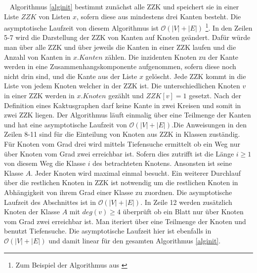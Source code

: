 \vspace{-6mm}
~\linebreak
Algorithmus \ref{alginit} bestimmt zunächst alle ZZK und speichert sie in einer Liste $ZZK$ von Listen $x$, sofern diese aus mindestens drei Kanten besteht. Die asymptotische Laufzeit von diesem Algorithmus ist $\mathcal{O}(|V|+|E|)$ \footnote{Zum Beispiel der Algorithmus aus \cite{vorlesung}}. \newline
In den Zeilen 5-7 wird die Darstellung der ZZK von Kanten auf Knoten geändert. Dafür würde man über alle ZZK und über jeweils die Kanten in einer ZZK laufen und die Anzahl von Kanten in $x.Kanten$ zählen. Die inzidenten Knoten zu der Kante werden in eine Zusammenhangskomponente aufgenommen, sofern diese noch nicht drin sind, und die Kante aus der Liste $x$ gelöscht. Jede ZZK kommt in die Liste von jedem Knoten welcher in der ZZK ist. Die unterschiedlichen Knoten $v$ in einer ZZK werden in $x.Knoten$ gezählt und $ZZK[v]=1$ gesetzt. Nach der Definition eines Kaktusgraphen darf keine Kante in zwei Kreisen und somit in zwei ZZK liegen. Der Algorithmus läuft einmalig über eine Teilmenge der Kanten und hat eine asymptotische Laufzeit von $\mathcal{O}(|V|+|E|)$.\newline\newline Die Anweisungen in den Zeilen 8-11 sind für die Einteilung von Knoten aus ZZK in Klassen zuständig. Für Knoten vom Grad drei wird mittels Tiefensuche ermittelt ob ein Weg nur über Knoten vom Grad zwei erreichbar ist. Sofern dies zutrifft ist die Länge $i\geq 1$ von diesem Weg die Klasse $i$ des betrachteten Knotens. Ansonsten ist seine Klasse $A$. Jeder Knoten wird maximal einmal besucht. Ein weiterer Durchlauf über die restlichen Knoten in ZZK ist notwendig um die restlichen Knoten in Abhängigkeit von ihrem Grad einer Klasse zu zuordnen. Die asymptotische Laufzeit des Abschnittes ist in $\mathcal{O}(|V|+|E|)$.\vspace{-1mm}\newline\newline
In Zeile 12 werden zusätzlich Knoten der Klasse $A$  mit $deg(v)\geq 4$ überprüft ob ein Blatt nur über Knoten vom Grad zwei erreichbar ist. Man iteriert über eine Teilmenge der Knoten und benutzt Tiefensuche. Die asymptotische Laufzeit hier ist ebenfalls in $\mathcal{O}(|V|+|E|)$ und damit linear für den gesamten Algorithmus \ref{alginit}.\vspace{-4mm}\newline
